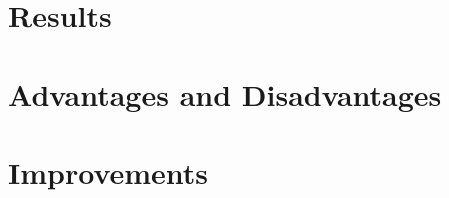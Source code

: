 \documentclass[]{article}
\begin{document}
\section{Results}


\section{Advantages and Disadvantages}





\section{Improvements}




\clearpage


\end{document}
